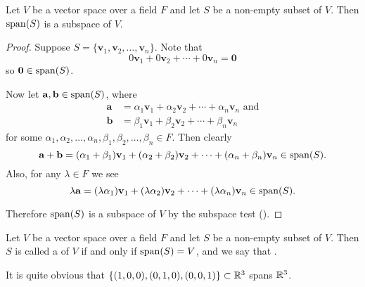 \begin{proposition}
    Let $V$ be a vector space over a field $F$ and let $S$ be a non-empty subset of $V$. Then $\mathrm{span}(S)$ is a subspace of $V$.
\end{proposition}
\begin{proof}
    Suppose $S = \{\mathbf{v}_1, \mathbf{v}_2, \dots, \mathbf{v}_n\}$. Note that
    \[
        0\mathbf{v}_1 + 0\mathbf{v}_2 + \cdots + 0\mathbf{v}_n = \mathbf{0}
    \]
    so $\mathbf{0} \in \mathrm{span}(S)$.

    Now let $\mathbf{a}, \mathbf{b} \in \mathrm{span}(S)$, where
    \begin{align*}
        \mathbf{a} &= \alpha_1\mathbf{v}_1 + \alpha_2\mathbf{v}_2 + \cdots + \alpha_n\mathbf{v}_n \text{ and}\\
        \mathbf{b} &= \beta_1\mathbf{v}_1 + \beta_2\mathbf{v}_2 + \cdots + \beta_n\mathbf{v}_n
    \end{align*}
    for some $\alpha_1, \alpha_2, \dots, \alpha_n, \beta_1, \beta_2, \dots, \beta_n \in F$. Then clearly
    \[
        \mathbf{a} + \mathbf{b} = (\alpha_1+\beta_1)\mathbf{v}_1 + (\alpha_2+\beta_2)\mathbf{v}_2 + \cdots + (\alpha_n+\beta_n)\mathbf{v}_n \in \mathrm{span}(S).
    \]
    Also, for any $\lambda \in F$ we see
    \[
        \lambda\mathbf{a} = (\lambda\alpha_1)\mathbf{v}_1 + (\lambda\alpha_2)\mathbf{v}_2 + \cdots + (\lambda\alpha_n)\mathbf{v}_n \in \mathrm{span}(S).
    \]

    Therefore $\mathrm{span}(S)$ is a subspace of $V$ by the subspace test ().
\end{proof}

\begin{definition}
    Let $V$ be a vector space over a field $F$ and let $S$ be a non-empty subset of $V$. Then $S$ is called a  of $V$ if and only if $\mathrm{span}(S) = V$, and we say that .
\end{definition}

\begin{example}
    It is quite obvious that $\{(1, 0, 0), (0, 1, 0), (0, 0, 1)\} \subset \mathbb{R}^3$ spans $\mathbb{R}^3$.
\end{example}

